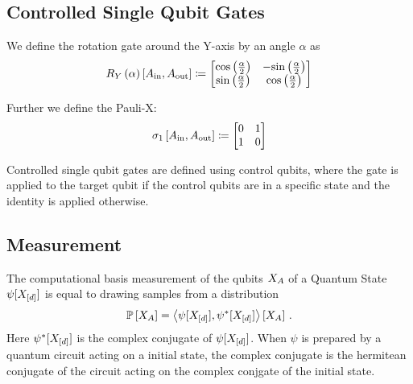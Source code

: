 \documentclass[aps,onecolumn,nofootinbib,pra]{article}
\begin{document}
    \subsection{Controlled Single Qubit Gates}

    We define the rotation gate around the Y-axis by an angle $\alpha$ as
    \begin{align*}
        R_Y\left({\alpha}\right)\left[A_{\mathrm{in}},A_{\mathrm{out}}\right] \coloneqq
        \begin{bmatrix}
            \mathrm{cos}\left(\frac{\alpha}{2}\right) & -\mathrm{sin}\left(\frac{\alpha}{2}\right) \\
            \mathrm{sin}\left(\frac{\alpha}{2}\right) & \mathrm{cos}\left(\frac{\alpha}{2}\right)
        \end{bmatrix}
    \end{align*}

    Further we define the Pauli-X:
    \begin{align*}
        \sigma_1\left[A_{\mathrm{in}},A_{\mathrm{out}}\right] \coloneqq
        \begin{bmatrix}
            0 & 1 \\
            1 & 0
        \end{bmatrix}
    \end{align*}

    Controlled single qubit gates are defined using control qubits, where the gate is applied to the target qubit if the control qubits are in a specific state and the identity is applied otherwise.

    \subsection{Measurement}

    The computational basis measurement of the qubits $X_{A}$ of a Quantum State $\psi[X_{[d]}]$ is equal to drawing samples from a distribution
    \begin{align*}
        \mathbb{P}\left[X_{A}\right] = \left\langle 
            \psi[X_{[d]}], \psi^{*}[X_{[d]}]
        \right\rangle \left[ X_{A} \right] \, .
    \end{align*}
    Here $\psi^{*}[X_{[d]}]$ is the complex conjugate of $\psi[X_{[d]}]$.
    When $\psi$ is prepared by a quantum circuit acting on a initial state, the complex conjugate is the hermitean conjugate of the circuit acting on the complex conjgate of the initial state.
\end{document}
